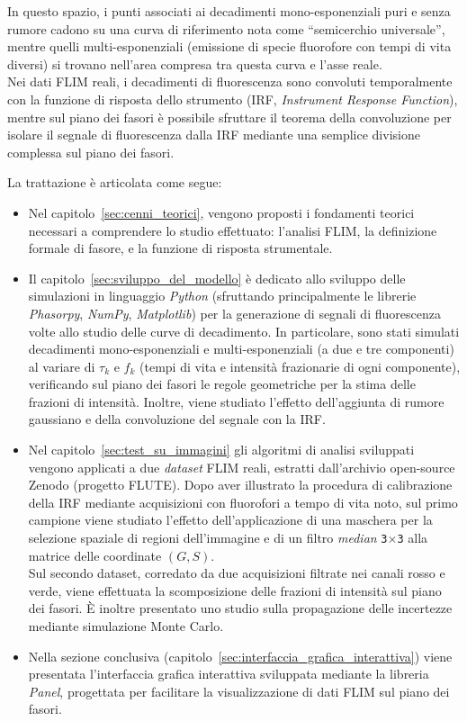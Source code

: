 \noindent In questo spazio, i punti associati ai decadimenti mono-esponenziali puri e senza rumore cadono su una curva di riferimento nota come ``semicerchio universale'', mentre quelli multi-esponenziali (emissione di specie fluorofore con tempi di vita diversi) si trovano nell'area compresa tra questa curva e l'asse reale.\\
Nei dati FLIM reali, i decadimenti di fluorescenza sono convoluti temporalmente con la funzione di risposta dello strumento (IRF, \textit{Instrument Response Function}), mentre sul piano dei fasori è possibile sfruttare il teorema della convoluzione per isolare il segnale di fluorescenza dalla IRF mediante una semplice divisione complessa sul piano dei fasori.

\noindent La trattazione è articolata come segue:
\begin{itemize}
    \item Nel capitolo~\ref{sec:cenni_teorici}, vengono proposti i fondamenti teorici necessari a comprendere lo studio effettuato: l'analisi FLIM, la definizione formale di fasore, e la funzione di risposta strumentale.
    \item Il capitolo~\ref{sec:sviluppo_del_modello} è dedicato allo sviluppo delle simulazioni in linguaggio \textit{Python} (sfruttando principalmente le librerie \textit{Phasorpy}, \textit{NumPy}, \textit{Matplotlib}) per la generazione di segnali di fluorescenza volte allo studio delle curve di decadimento. In particolare, sono stati simulati decadimenti mono-esponenziali e multi-esponenziali (a due e tre componenti) al variare di $\tau_k$ e $f_k$ (tempi di vita e intensità frazionarie di ogni componente), verificando sul piano dei fasori le regole geometriche per la stima delle frazioni di intensità. Inoltre, viene studiato l'effetto dell'aggiunta di rumore gaussiano e della convoluzione del segnale con la IRF.
    \item Nel capitolo~\ref{sec:test_su_immagini} gli algoritmi di analisi sviluppati vengono applicati a due \textit{dataset} FLIM reali, estratti dall'archivio open-source Zenodo (progetto FLUTE). Dopo aver illustrato la procedura di calibrazione della IRF mediante acquisizioni con fluorofori a tempo di vita noto, sul primo campione viene studiato l'effetto dell'applicazione di una maschera per la selezione spaziale di regioni dell'immagine e di un filtro \textit{median} \texttt{3}$\times$\texttt{3} alla matrice delle coordinate $(G, S)$.\\
    Sul secondo dataset, corredato da due acquisizioni filtrate nei canali rosso e verde, viene effettuata la scomposizione delle frazioni di intensità sul piano dei fasori. È inoltre presentato uno studio sulla propagazione delle incertezze mediante simulazione Monte Carlo.
    \item Nella sezione conclusiva (capitolo~\ref{sec:interfaccia_grafica_interattiva}) viene presentata l'interfaccia grafica interattiva sviluppata mediante la libreria \textit{Panel}, progettata per facilitare la visualizzazione di dati FLIM sul piano dei fasori.
\end{itemize}


